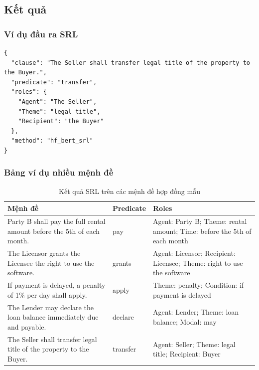 \subsection{Kết quả}

\subsubsection{Ví dụ đầu ra SRL}

\begin{verbatim}
{
  "clause": "The Seller shall transfer legal title of the property to the Buyer.",
  "predicate": "transfer",
  "roles": {
    "Agent": "The Seller",
    "Theme": "legal title",
    "Recipient": "the Buyer"
  },
  "method": "hf_bert_srl"
}
\end{verbatim}

\subsubsection{Bảng ví dụ nhiều mệnh đề}

\begin{table}[H]
    \centering
    \caption{Kết quả SRL trên các mệnh đề hợp đồng mẫu}
    \label{tab:srl_examples}
    \begin{tabularx}{\textwidth}{|X|l|X|}
        \hline
        \textbf{Mệnh đề} & \textbf{Predicate} & \textbf{Roles} \\ \hline
        Party B shall pay the full rental amount before the 5th of each month.
        & pay
        & Agent: Party B; Theme: rental amount; Time: before the 5th of each month \\ \hline
        The Licensor grants the Licensee the right to use the software.
        & grants
        & Agent: Licensor; Recipient: Licensee; Theme: right to use the software \\ \hline
        If payment is delayed, a penalty of 1\% per day shall apply.
        & apply
        & Theme: penalty; Condition: if payment is delayed \\ \hline
        The Lender may declare the loan balance immediately due and payable.
        & declare
        & Agent: Lender; Theme: loan balance; Modal: may \\ \hline
        The Seller shall transfer legal title of the property to the Buyer.
        & transfer
        & Agent: Seller; Theme: legal title; Recipient: Buyer \\ \hline
    \end{tabularx}
\end{table}

